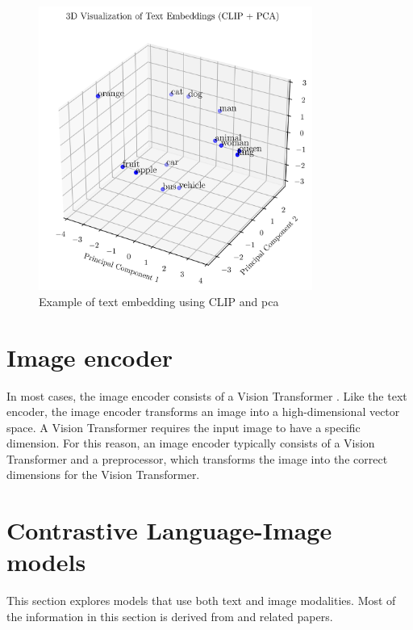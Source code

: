     \begin{figure}
        \centering
        \includegraphics[width = 0.8\textwidth]{Images/crossmodalnetworks/3DEmbedding.png}
        \caption{Example of text embedding using CLIP and \Acrshort{pca}}
        \label{fig:crossmodalnetworks:3demb}
    \end{figure}
    
    \section{Image encoder}

    In most cases, the image encoder consists of a Vision Transformer \cite{Vis_N_Grams}. 
    Like the text encoder, the image encoder transforms an image into a high-dimensional vector space. 
    A Vision Transformer requires the input image to have a specific dimension. 
    For this reason, an image encoder typically consists of a Vision Transformer and a preprocessor, which transforms the image into the correct dimensions for the Vision Transformer.

    \section{Contrastive Language-Image models
        \label{section:languageimagemodels}}
        This section explores models that use both text and image modalities. 
        Most of the information in this section is derived from \cite{cliplikeweb} and related papers.

